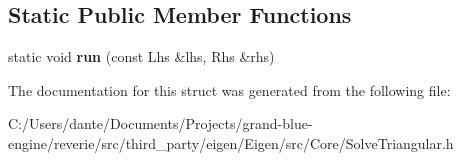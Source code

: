 \subsection*{Static Public Member Functions}
\begin{DoxyCompactItemize}
\item 
\mbox{\label{struct_eigen_1_1internal_1_1triangular__solver__selector_3_01_lhs_00_01_rhs_00_01_side_00_01_mod9d4c365fbf3ecd733e3c477f950cfbe8_aa9bce083f5802ae4fab1e7e3c6e8a224}} 
static void {\bfseries run} (const Lhs \&lhs, Rhs \&rhs)
\end{DoxyCompactItemize}


The documentation for this struct was generated from the following file\+:\begin{DoxyCompactItemize}
\item 
C\+:/\+Users/dante/\+Documents/\+Projects/grand-\/blue-\/engine/reverie/src/third\+\_\+party/eigen/\+Eigen/src/\+Core/Solve\+Triangular.\+h\end{DoxyCompactItemize}
